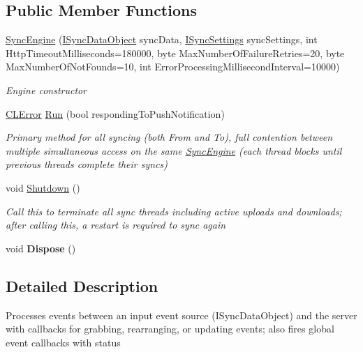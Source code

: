 \subsection*{Public Member Functions}
\begin{DoxyCompactItemize}
\item 
\hyperlink{class_cloud_api_public_1_1_sync_1_1_sync_engine_a3f309497452e69510b6a87ad5004d646}{Sync\-Engine} (\hyperlink{interface_cloud_api_public_1_1_interfaces_1_1_i_sync_data_object}{I\-Sync\-Data\-Object} sync\-Data, \hyperlink{interface_cloud_api_public_1_1_interfaces_1_1_i_sync_settings}{I\-Sync\-Settings} sync\-Settings, int Http\-Timeout\-Milliseconds=180000, byte Max\-Number\-Of\-Failure\-Retries=20, byte Max\-Number\-Of\-Not\-Founds=10, int Error\-Processing\-Millisecond\-Interval=10000)
\begin{DoxyCompactList}\small\item\em Engine constructor \end{DoxyCompactList}\item 
\hyperlink{class_cloud_api_public_1_1_model_1_1_c_l_error}{C\-L\-Error} \hyperlink{class_cloud_api_public_1_1_sync_1_1_sync_engine_a2fd9968f27d029e66e432cc90030e817}{Run} (bool responding\-To\-Push\-Notification)
\begin{DoxyCompactList}\small\item\em Primary method for all syncing (both From and To), full contention between multiple simultaneous access on the same \hyperlink{class_cloud_api_public_1_1_sync_1_1_sync_engine}{Sync\-Engine} (each thread blocks until previous threads complete their syncs) \end{DoxyCompactList}\item 
void \hyperlink{class_cloud_api_public_1_1_sync_1_1_sync_engine_abb41dd157521158572cd9ce50065fc06}{Shutdown} ()
\begin{DoxyCompactList}\small\item\em Call this to terminate all sync threads including active uploads and downloads; after calling this, a restart is required to sync again \end{DoxyCompactList}\item 
\hypertarget{class_cloud_api_public_1_1_sync_1_1_sync_engine_ae2f6f59bd5dd203f72fd2ffd0d2c9fd7}{void {\bfseries Dispose} ()}\label{class_cloud_api_public_1_1_sync_1_1_sync_engine_ae2f6f59bd5dd203f72fd2ffd0d2c9fd7}

\end{DoxyCompactItemize}


\subsection{Detailed Description}
Processes events between an input event source (I\-Sync\-Data\-Object) and the server with callbacks for grabbing, rearranging, or updating events; also fires global event callbacks with status 



